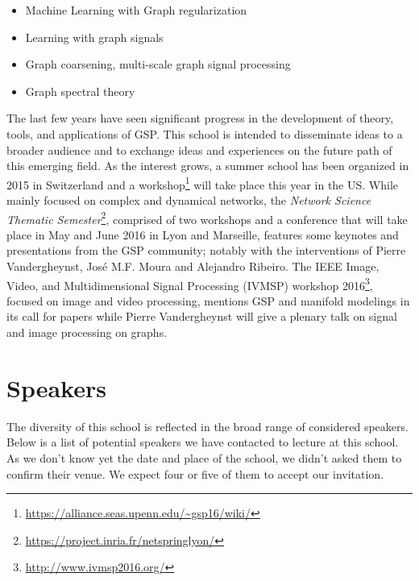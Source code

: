 \documentclass[a4paper]{scrartcl}
\newcommand{\nati}[1]{{\color[rgb]{.1,.6,.1}{#1}}}
\begin{document}
\begin{itemize}
	\item Machine Learning with Graph regularization \cite{smola,belkin2005towards,zhou2004regularization,zhou2005learning,belkin2006manifold}
	\item Learning with graph signals \nati{What is the difference with the one before}
	\item Graph coarsening, multi-scale graph signal processing \cite{spielman2011graph,shuman2016multiscale,liu_coarsening,lafon_coarse,jansen}
	\item Graph spectral theory \cite{chung1997spectral,belkin2007convergence,shuman2015vertex,sandryhaila2014discrete,Nakatsukasa2013mysteries,brooks,dekel}
\end{itemize}

The last few years have seen significant progress in the development of theory,
tools, and applications of GSP. This school is intended to disseminate ideas to
a broader audience and to exchange ideas and experiences on the future path of
this emerging field.
As the interest grows, a summer school has been organized in 2015 in Switzerland
and a workshop\footnote{\url{https://alliance.seas.upenn.edu/~gsp16/wiki/}} will
take place this year in the US.
While mainly focused on complex and dynamical networks, the \textit{Network
Science Thematic Semester}\footnote{
\url{https://project.inria.fr/netspringlyon/}}, comprised of two workshops and a
conference that will take place in May and June 2016 in Lyon and Marseille,
features some keynotes and presentations from the GSP community; notably with
the interventions of Pierre Vandergheynst, José M.F. Moura and Alejandro
Ribeiro.
The IEEE Image, Video, and Multidimensional Signal Processing (IVMSP) workshop
2016\footnote{ \url{http://www.ivmsp2016.org/}}, focused on image and video
processing, mentions GSP and manifold modelings in its call for papers while
Pierre Vandergheynst will give a plenary talk on signal and image processing on
graphs.

\section{Speakers}

The diversity of this school is reflected in the broad range of considered
speakers. Below is a list of potential speakers we have contacted to lecture at
this school. As we don't know yet the date and place of the school, we didn't
asked them to confirm their venue. We expect four or five of them to accept our
invitation.
\end{document}
